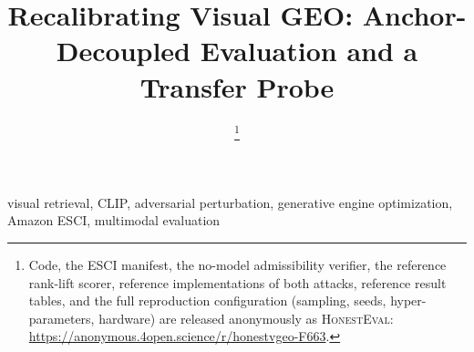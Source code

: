 \documentclass[10pt,conference]{IEEEtran}
\begin{document}
\title{Recalibrating Visual GEO: Anchor-Decoupled Evaluation and a Transfer Probe}

\author{
\thanks{Code, the ESCI manifest, the no-model admissibility verifier, the reference rank-lift scorer, reference implementations of both attacks, reference result tables, and the full reproduction configuration (sampling, seeds, hyper-parameters, hardware) are released anonymously as \textsc{HonestEval}: \url{https://anonymous.4open.science/r/honestvgeo-F663}.}}

\maketitle

\begin{abstract}

\end{abstract}

\begin{IEEEkeywords}
visual retrieval, CLIP, adversarial perturbation, generative engine optimization, Amazon ESCI, multimodal evaluation
\end{IEEEkeywords}











\end{document}
